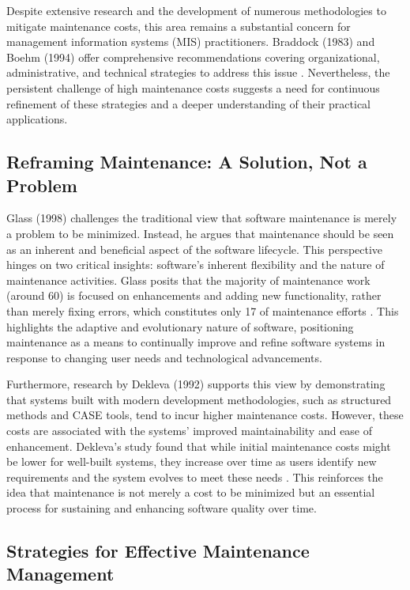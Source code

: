 Despite extensive research and the development of numerous methodologies to mitigate maintenance costs, this area remains a substantial concern for management information systems (MIS) practitioners. Braddock (1983) and Boehm (1994) offer comprehensive recommendations covering organizational, administrative, and technical strategies to address this issue  . Nevertheless, the persistent challenge of high maintenance costs suggests a need for continuous refinement of these strategies and a deeper understanding of their practical applications.

\subsection{Reframing Maintenance: A Solution, Not a Problem}

Glass (1998) challenges the traditional view that software maintenance is merely a problem to be minimized. Instead, he argues that maintenance should be seen as an inherent and beneficial aspect of the software lifecycle. This perspective hinges on two critical insights: software's inherent flexibility and the nature of maintenance activities. Glass posits that the majority of maintenance work (around 60) is focused on enhancements and adding new functionality, rather than merely fixing errors, which constitutes only 17 of maintenance efforts . This highlights the adaptive and evolutionary nature of software, positioning maintenance as a means to continually improve and refine software systems in response to changing user needs and technological advancements.

Furthermore, research by Dekleva (1992) supports this view by demonstrating that systems built with modern development methodologies, such as structured methods and CASE tools, tend to incur higher maintenance costs. However, these costs are associated with the systems' improved maintainability and ease of enhancement. Dekleva’s study found that while initial maintenance costs might be lower for well-built systems, they increase over time as users identify new requirements and the system evolves to meet these needs . This reinforces the idea that maintenance is not merely a cost to be minimized but an essential process for sustaining and enhancing software quality over time.

\subsection{Strategies for Effective Maintenance Management}

